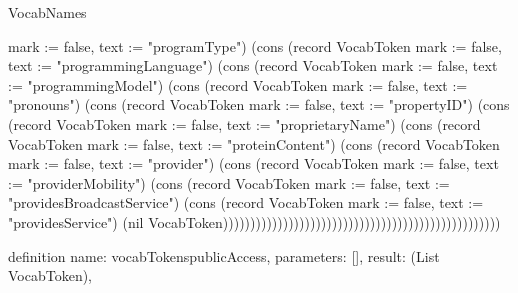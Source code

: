 \begin{lexlean}{VocabNames}
\begin{semanticmodule}
{{mark := false, text := "programType"}) (cons (record VocabToken {mark := false, text := "programmingLanguage"}) (cons (record VocabToken {mark := false, text := "programmingModel"}) (cons (record VocabToken {mark := false, text := "pronouns"}) (cons (record VocabToken {mark := false, text := "propertyID"}) (cons (record VocabToken {mark := false, text := "proprietaryName"}) (cons (record VocabToken {mark := false, text := "proteinContent"}) (cons (record VocabToken {mark := false, text := "provider"}) (cons (record VocabToken {mark := false, text := "providerMobility"}) (cons (record VocabToken {mark := false, text := "providesBroadcastService"}) (cons (record VocabToken {mark := false, text := "providesService"}) (nil VocabToken)))))))))))))))))))))))))))))))))))))))))))))))))))
}

definition{
  name: vocabTokenspublicAccess,
  parameters: [],
  result: (List VocabToken),
}
\end{semanticmodule}
\end{lexlean}
